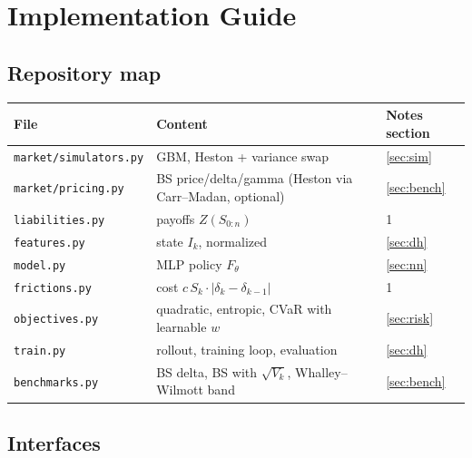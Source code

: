 \documentclass[11pt]{article}
\theoremstyle{definition}
\theoremstyle{remark}
\begin{document}
\section{Implementation Guide}\label{sec:impl}

\subsection{Repository map}

\begin{center}\small
\renewcommand{\arraystretch}{1.3}
\begin{tabular}{@{}lll@{}}
\toprule
File & Content & Notes section\\
\midrule
\texttt{market/simulators.py} & GBM, Heston + variance swap & \ref{sec:sim}\\
\texttt{market/pricing.py} & BS price/delta/gamma (Heston via Carr--Madan, optional) & \ref{sec:bench}\\
\texttt{liabilities.py} & payoffs $Z(S_{0:n})$ & 1\\
\texttt{features.py} & state $I_k$, normalized & \ref{sec:dh}\\
\texttt{model.py} & MLP policy $F_\theta$ & \ref{sec:nn}\\
\texttt{frictions.py} & cost $c\,S_k\cdot|\delta_k-\delta_{k-1}|$ & 1\\
\texttt{objectives.py} & quadratic, entropic, CVaR with learnable $w$ & \ref{sec:risk}\\
\texttt{train.py} & rollout, training loop, evaluation & \ref{sec:dh}\\
\texttt{benchmarks.py} & BS delta, BS with $\sqrt{V_k}$, Whalley--Wilmott band & \ref{sec:bench}\\
\bottomrule
\end{tabular}
\end{center}

\subsection{Interfaces}
\end{document}
